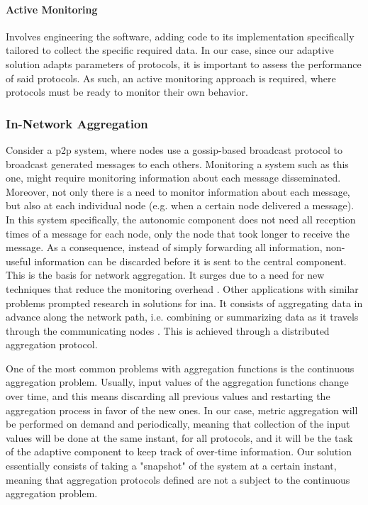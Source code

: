 \paragraph{Active Monitoring} \label{par:activemonitoring} Involves engineering the software, adding code to its implementation specifically tailored to collect the specific required data. In our case, since our adaptive solution adapts parameters of protocols, it is important to assess the performance of said protocols. As such, an active monitoring approach is required, where protocols must be ready to monitor their own behavior.

\subsubsection{In-Network Aggregation}
\label{sssec:innetworkaggregation}

Consider a \gls{p2p} system, where nodes use a gossip-based broadcast protocol to broadcast generated messages to each others. Monitoring a system such as this one, might require monitoring information about each message disseminated. Moreover, not only there is a need to monitor information about each message, but also at each individual node (e.g. when a certain node delivered a message). In this system specifically, the autonomic component does not need all reception times of a message for each node, only the node that took longer to receive the message. As a consequence, instead of simply forwarding all information, non-useful information can be discarded before it is sent to the central component. This is the basis for network aggregation. It surges due to a need for new techniques that reduce the monitoring overhead \cite{Oreizy1999}. Other applications with similar problems prompted research in solutions for \gls{ina}. It consists of aggregating data in advance along the network path, i.e. combining or summarizing data as it travels through the communicating nodes \cite{Feng2023}. This is achieved through a distributed aggregation protocol.

One of the most common problems with aggregation functions is the continuous aggregation problem\cite{Costa2018}. Usually, input values of the aggregation functions change over time, and this means discarding all previous values and restarting the aggregation process in favor of the new ones. In our case, metric aggregation will be performed on demand and periodically, meaning that collection of the input values will be done at the same instant, for all protocols, and it will be the task of the adaptive component to keep track of over-time information. Our solution essentially consists of taking a "snapshot" of the system at a certain instant, meaning that aggregation protocols defined are not a subject to the continuous aggregation problem.

